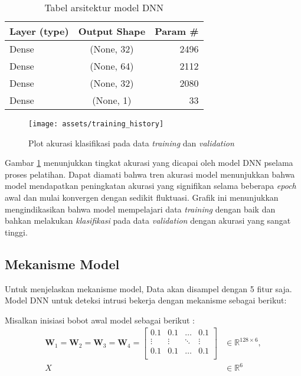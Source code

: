 \documentclass[a4paper,12pt]{report}
\begin{document}
\begin{longtable}{|l|  c|  r|}
	\caption{Tabel arsitektur model DNN}
	\label{tabel_arsitektur} \\
		\hline
		Layer (type) & Output Shape & Param \# \\
		\hline
		Dense & (None, 32) & 2496 \\
		\hline
		Dense & (None, 64) & 2112 \\
		\hline
		Dense & (None, 32) & 2080 \\
		\hline
		Dense & (None, 1) & 33 \\
		\hline
\end{longtable}

\begin{figure}[H]
	\center \texttt{[image: assets/training\_history]}
	\caption{Plot akurasi klasifikasi pada data \textit{training} dan \textit{validation}}
	\label{training_history}
\end{figure}

Gambar \ref{training_history} menunjukkan tingkat akurasi yang dicapai oleh model DNN pselama proses pelatihan. Dapat diamati bahwa tren akurasi model menunjukkan bahwa model mendapatkan peningkatan akurasi yang signifikan selama beberapa \textit{epoch} awal dan mulai konvergen dengan sedikit fluktuasi. Grafik ini menunjukkan mengindikasikan bahwa model mempelajari data \textit{training} dengan baik dan bahkan melakukan \textit{klasifikasi} pada data \textit{validation} dengan akurasi yang sangat tinggi. 

\subsection{Mekanisme Model}
Untuk menjelaskan mekanisme model, Data akan disampel dengan 5 fitur saja. Model DNN untuk deteksi intrusi bekerja dengan mekanisme sebagai berikut:

Misalkan inisiasi bobot awal model sebagai berikut :
\begin{equation}
	\begin{split}
		\mathbf{W}_{1} =\mathbf{W}_{2} = \mathbf{W}_{3} = \mathbf{W}_{4} = \begin{bmatrix}
			0.1 & 0.1 & \dots & 0.1 \\
			\vdots & \vdots & \ddots & \vdots \\
			0.1 & 0.1 & \dots & 0.1 \\
		\end{bmatrix} &\in \mathbb{R}^{128 \times 6}, \\
		X &\in \mathbb{R}^{6} \\
	\end{split}
\end{equation}
\end{document}
